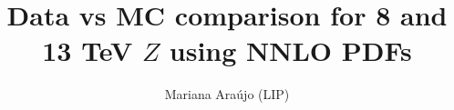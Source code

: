 \documentclass{article}
\begin{document}
\title{Data vs MC comparison for 8 and 13 TeV $Z$ using NNLO PDFs}
\author{Mariana Ara\'ujo (LIP)}
\maketitle

\clearpage

\end{document}

